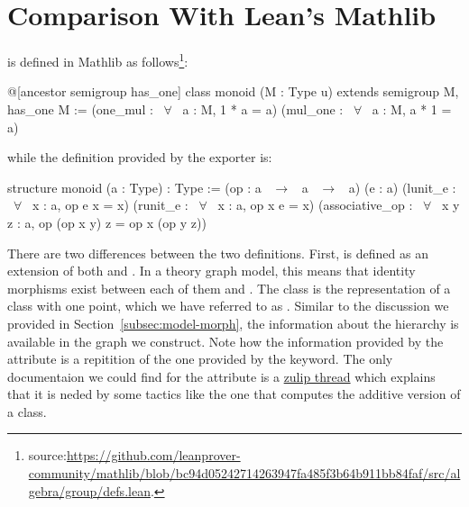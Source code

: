 
\section{Comparison With Lean's Mathlib}
\label{sec:lean_comparison}
 is defined in Mathlib as follows\footnote{source:\url{https://github.com/leanprover-community/mathlib/blob/bc94d05242714263947fa485f3b64b911bb84faf/src/algebra/group/defs.lean}.}: 
\begin{leancode} 
@[ancestor semigroup has_one]
class monoid (M : Type u) extends semigroup M, has_one M :=
  (one_mul : ~$\forall$~ a : M, 1 * a = a) (mul_one : ~$\forall$~ a : M, a * 1 = a)
\end{leancode} 
\noindent while the definition provided by the exporter is: 
\begin{leancode} 
structure monoid (a : Type) : Type := 
  (op : a ~$\to$~ a ~$\to$~ a)
  (e  : a)
  (lunit_e : ~$\forall$~ {x : a}, op e x = x)
  (runit_e : ~$\forall$~ {x : a}, op x e = x)
  (associative_op : ~$\forall$~ {x y z : a}, op (op x y) z = op x (op y z)) 
\end{leancode} 
There are two differences between the two definitions. First,  is defined as an extension of both  and . 
In a theory graph model, this means that identity morphisms exist between each of them and . The  class is the representation of a class with one point, which we have referred to as . 
Similar to the discussion we provided in Section~\ref{subsec:model-morph}, the information about the hierarchy is available in the graph we construct. 
Note how the information provided by the  attribute is a repitition of the one provided by the  keyword. The only documentaion we could find for the  attribute is a 
\href{https://leanprover.zulipchat.com/#narrow/stream/113488-general/topic/ancestor}{zulip thread}
which explains that it is neded by some tactics like the one that computes the additive version of a class. 

